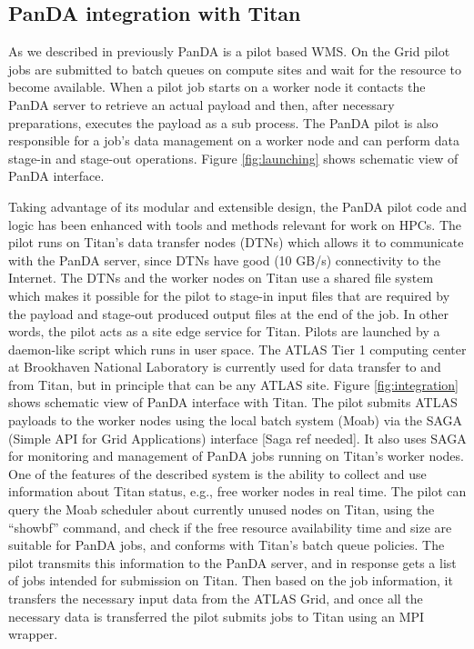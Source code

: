 \subsection{PanDA integration with Titan}
\label{subsec:integration}

As we described in previously PanDA is a pilot based WMS. On the Grid pilot
jobs are submitted to batch queues on compute sites and wait for the resource
to become available. When a pilot job starts on a worker node it contacts the
PanDA server to retrieve an actual payload and then, after necessary
preparations, executes the payload as a sub process. The PanDA pilot is also
responsible for a job's data management on a worker node and can perform data
stage-in and stage-out operations. Figure \ref{fig:launching} shows schematic
view of PanDA interface.

Taking advantage of its modular and extensible design, the PanDA pilot code and
logic has been enhanced with tools and methods relevant for work on HPCs. The
pilot runs on Titan's data transfer nodes (DTNs) which allows it to communicate
with the PanDA server, since DTNs have good (10 GB/s) connectivity to the
Internet. The DTNs and the worker nodes on Titan use a shared file system which
makes it possible for the pilot to stage-in input files that are required by
the payload and stage-out produced output files at the end of the job. In other
words, the pilot acts as a site edge service for Titan. Pilots are launched by
a daemon-like script which runs in user space. The ATLAS Tier 1 computing
center at Brookhaven National Laboratory is currently used for data transfer to
and from Titan, but in principle that can be any ATLAS site. Figure
\ref{fig:integration} shows schematic view of PanDA interface with Titan.
The pilot submits ATLAS payloads to the worker nodes using the local batch
system (Moab) via the SAGA (Simple API for Grid Applications) interface [Saga
ref needed]. It also uses SAGA for monitoring and management of PanDA jobs
running on Titan's worker nodes. One of the features of the described system is
the ability to collect and use information about Titan status, e.g., free
worker nodes in real time. The pilot can query the Moab scheduler about
currently unused nodes on Titan, using the ``showbf'' command, and check if the
free resource availability time and size are suitable for PanDA jobs, and
conforms with Titan's batch queue policies. The pilot transmits this
information to the PanDA server, and in response gets a list of jobs intended
for submission on Titan. Then based on the job information, it transfers the
necessary input data from the ATLAS Grid, and once all the necessary data is
transferred the pilot submits jobs to Titan using an MPI wrapper.

